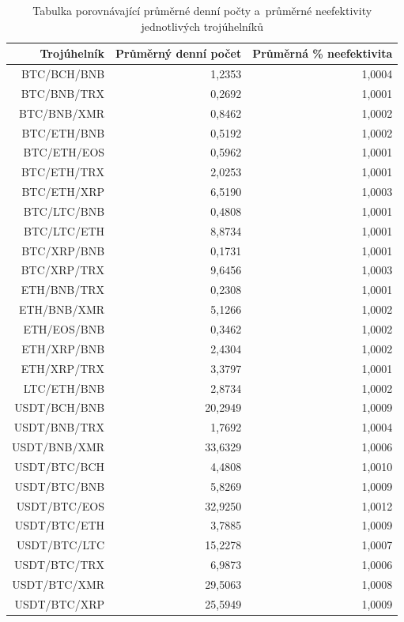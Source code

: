 \documentclass[thesis=B,czech]{FITthesis}[2019/03/21]
\begin{document}
\begin{table}\centering
\caption{Tabulka porovnávající průměrné denní počty a~průměrné neefektivity jednotlivých trojúhelníků}
\label{table_averages}
\begin{tabular}{|| r | r | r ||}\hline Trojúhelník & Průměrný denní počet & Průměrná \% neefektivita\\ [0.5ex]
 \hline\hline BTC/BCH/BNB & 1,2353 & 1,0004\\ 
 \hline BTC/BNB/TRX & 0,2692 & 1,0001\\ 
 \hline BTC/BNB/XMR & 0,8462 & 1,0002\\ 
 \hline BTC/ETH/BNB & 0,5192 & 1,0002\\ 
 \hline BTC/ETH/EOS & 0,5962 & 1,0001\\ 
 \hline BTC/ETH/TRX & 2,0253 & 1,0001\\ 
 \hline BTC/ETH/XRP & 6,5190 & 1,0003\\ 
 \hline BTC/LTC/BNB & 0,4808 & 1,0001\\ 
 \hline BTC/LTC/ETH & 8,8734 & 1,0001\\ 
 \hline BTC/XRP/BNB & 0,1731 & 1,0001\\ 
 \hline BTC/XRP/TRX & 9,6456 & 1,0003\\ 
 \hline ETH/BNB/TRX & 0,2308 & 1,0001\\ 
 \hline ETH/BNB/XMR & 5,1266 & 1,0002\\ 
 \hline ETH/EOS/BNB & 0,3462 & 1,0002\\ 
 \hline ETH/XRP/BNB & 2,4304 & 1,0002\\ 
 \hline ETH/XRP/TRX & 3,3797 & 1,0001\\ 
 \hline LTC/ETH/BNB & 2,8734 & 1,0002\\ 
 \hline USDT/BCH/BNB & 20,2949 & 1,0009\\ 
 \hline USDT/BNB/TRX & 1,7692 & 1,0004\\ 
 \hline USDT/BNB/XMR & 33,6329 & 1,0006\\ 
 \hline USDT/BTC/BCH & 4,4808 & 1,0010\\ 
 \hline USDT/BTC/BNB & 5,8269 & 1,0009\\ 
 \hline USDT/BTC/EOS & 32,9250 & 1,0012\\ 
 \hline USDT/BTC/ETH & 3,7885 & 1,0009\\ 
 \hline USDT/BTC/LTC & 15,2278 & 1,0007\\ 
 \hline USDT/BTC/TRX & 6,9873 & 1,0006\\ 
 \hline USDT/BTC/XMR & 29,5063 & 1,0008\\ 
 \hline USDT/BTC/XRP & 25,5949 & 1,0009\\ 

\end{tabular}
\end{table}
\end{document}
